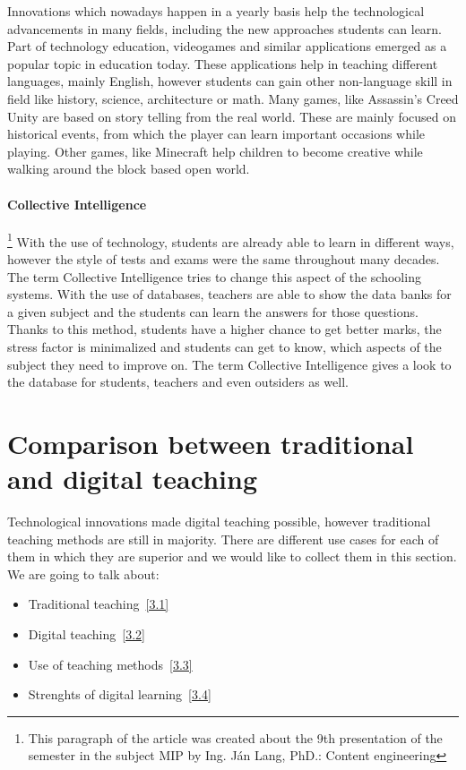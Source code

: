\documentclass[10pt,oneside,english,a4paper]{article}
\begin{document}
	Innovations which nowadays happen in a yearly basis  help the technological advancements in many fields, including the new approaches students can learn. Part of technology education, videogames and similar applications emerged as a popular topic
in education today\cite{Okur2017}. These applications help in teaching different languages, mainly English, however students can gain other non-language skill in field like history, science, architecture or math. Many games, like Assassin's Creed Unity are based on story telling from the real world. These are mainly focused on historical events, from which the player can learn important occasions while playing. Other games, like Minecraft help children to become creative while walking around the block based open world. 

	\paragraph{Collective Intelligence}\footnote{This paragraph of the article was created about the 9th presentation of the semester in the subject MIP by Ing. Ján Lang, PhD.: Content engineering} With the use of technology, students are already able to learn in different ways, however the style of tests and exams were the same throughout many decades. The term Collective Intelligence tries to change this aspect of the schooling systems. With the use of databases, teachers are able to show the data banks for a given subject and the students can learn the answers for those questions. Thanks to this method, students have a higher chance to get better marks, the stress factor is minimalized and students can  get to know, which aspects of the subject they need to improve on. The term Collective Intelligence gives a look to the database for students, teachers and even outsiders as well.

\section{Comparison between traditional and digital teaching}\label{comparison}

	Technological innovations made digital teaching possible, however traditional teaching methods are still in majority. There are different use cases for each of them in which they are superior and we would like to collect them in this section. We are going to talk about:

\begin{itemize}
\item Traditional teaching~\ref{3.1}
\item Digital teaching~\ref{3.2}
\item Use of teaching methods~\ref{3.3}
\item Strenghts of digital learning~\ref{3.4}
\end{itemize}
\end{document}
